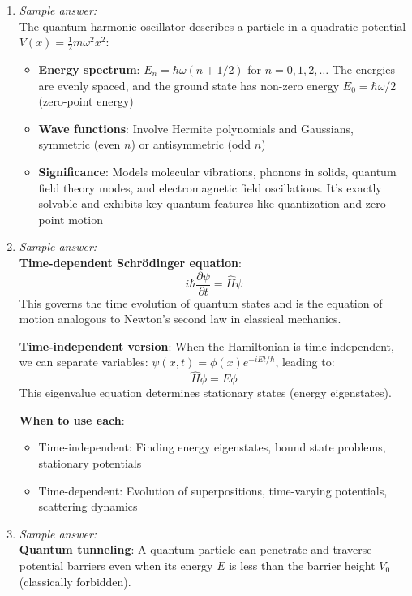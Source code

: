\documentclass[11pt]{article}
\begin{document}
\begin{enumerate}[label=\textbf{\arabic*.}]
  \item \emph{Sample answer:}\\
  The quantum harmonic oscillator describes a particle in a quadratic potential $V(x) = \frac{1}{2}m\omega^2 x^2$:
  \begin{itemize}
    \item \textbf{Energy spectrum}: $E_n = \hbar\omega(n + 1/2)$ for $n = 0, 1, 2, \ldots$ The energies 
    are evenly spaced, and the ground state has non-zero energy $E_0 = \hbar\omega/2$ (zero-point energy)
    \item \textbf{Wave functions}: Involve Hermite polynomials and Gaussians, symmetric (even $n$) or 
    antisymmetric (odd $n$)
    \item \textbf{Significance}: Models molecular vibrations, phonons in solids, quantum field theory modes, 
    and electromagnetic field oscillations. It's exactly solvable and exhibits key quantum features like 
    quantization and zero-point motion
  \end{itemize}

  \item \emph{Sample answer:}\\
  \textbf{Time-dependent Schr\"odinger equation}:
  $$i\hbar \frac{\partial \psi}{\partial t} = \hat{H}\psi$$
  This governs the time evolution of quantum states and is the equation of motion analogous to Newton's 
  second law in classical mechanics.

  \textbf{Time-independent version}: When the Hamiltonian is time-independent, we can separate variables: 
  $\psi(x,t) = \phi(x)e^{-iEt/\hbar}$, leading to:
  $$\hat{H}\phi = E\phi$$
  This eigenvalue equation determines stationary states (energy eigenstates).

  \textbf{When to use each}:
  \begin{itemize}
    \item Time-independent: Finding energy eigenstates, bound state problems, stationary potentials
    \item Time-dependent: Evolution of superpositions, time-varying potentials, scattering dynamics
  \end{itemize}

  \item \emph{Sample answer:}\\
  \textbf{Quantum tunneling}: A quantum particle can penetrate and traverse potential barriers even when 
  its energy $E$ is less than the barrier height $V_0$ (classically forbidden).


\end{enumerate}
\end{document}
